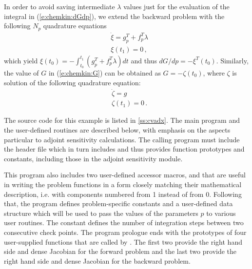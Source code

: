 In order to avoid saving intermediate $\lambda$ values just for the
evaluation of the integral in (\ref{e:chemkin:dGdp}), we extend the
backward problem with the following $N_p$ quadrature equations
\begin{equation}\label{e:chemkin:xi}
  \begin{split}
    &{\dot \xi} = g_p^T + f_p^T \lambda \\
    &\xi (t_1) = 0 \, ,
  \end{split}
\end{equation}
which yield $\xi(t_0) = - \int_{t_0}^{t_1} ( g_p^T + f_p^T \lambda) dt$
and thus ${dG}/{dp} = -\xi^T(t_0)$.
Similarly, the value of $G$ in (\ref{e:chemkin:G}) can be obtained as
$G = - \zeta(t_0)$, where $\zeta$ is solution of the following quadrature
equation:
\begin{equation}\label{e:chemkin:zeta}
  \begin{split}
    &{\dot\zeta} = g \\
    &\zeta(t_1) = 0 \, .
  \end{split}
\end{equation}

The source code for this example is listed in \A\ref{ss:cvadx}.
The main program and the user-defined routines are described below, 
with emphasis on the aspects particular to adjoint sensitivity calculations.
The calling program must include the {\cvodes} header file  which
in turn includes  and thus provides {\cvodes} function prototypes
and constants, including those in the adjoint sensitivity module.
 
This program also includes two user-defined accessor macros,
 and 
that are useful in writing the problem functions in a form closely
matching their mathematical description, i.e. with components numbered from 1 instead of from 0. 
Following that, the program defines problem-specific constants and a user-defined 
data structure which will be used to pass the values of the parameters $p$ to various
user routines. The constant  defines the number of integration steps
between two consecutive check points.
The program prologue ends with the prototypes of four user-supplied functions that are
called by {\cvodes}. The first two provide the right hand side and dense Jacobian
for the forward problem and the last two provide the right hand side and dense Jacobian 
for the backward problem.

